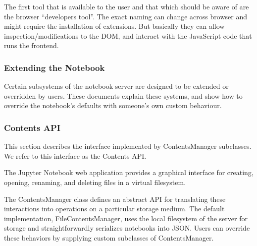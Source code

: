 The first tool that is available to the user and that which should be aware of are the
browser ``developers tool''. The exact naming can change across browser and might require
the installation of extensions. But basically they can allow inspection/modifications to
the DOM, and interact with the JavaScript code that runs the frontend.

\subsubsection{Extending the Notebook}
Certain subsystems of the notebook server are designed to be extended or overridden by
users. These documents explain these systems, and show how to override the notebook's
defaults with someone's own custom behaviour.

\subsubsection{Contents API}
This section describes the interface implemented by ContentsManager subclasses. We refer
to this interface as the Contents API.

The Jupyter Notebook web application provides a graphical interface for creating, opening,
renaming, and deleting files in a virtual filesystem.

The ContentsManager class defines an abstract API for translating these interactions into
operations on a particular storage medium. The default implementation,
FileContentsManager, uses the local filesystem of the server for storage and
straightforwardly serializes notebooks into JSON. Users can override these behaviors by
supplying custom subclasses of ContentsManager.

